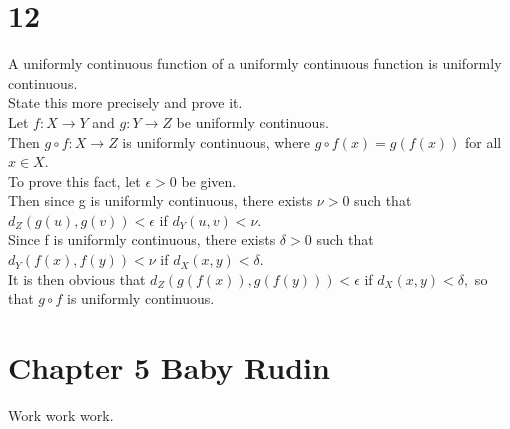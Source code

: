 \section*{12}
A uniformly continuous function of a uniformly continuous function is uniformly continuous. \\ 
State this more precisely and prove it. \\ 
Let $f: X \longrightarrow Y$ and $g: Y \longrightarrow Z$ be uniformly continuous. \\ 
Then $g \circ f : X \longrightarrow Z$ is uniformly continuous, where $g \circ f(x)=g(f(x))$ for all $x \in X.$ \\ 
To prove this fact, let $ \epsilon>0$ be given. \\ 
Then since g is uniformly continuous, there exists $ \nu >0$ such that $d_Z(g(u),g(v))< \epsilon$ if $d_Y(u,v)< \nu.$ \\ 
Since f is uniformly continuous, there exists $\delta >0$ such that $d_Y(f(x),f(y))< \nu$ if $d_X(x,y) < \delta.$ \\ 
It is then obvious that $d_Z(g(f(x)),g(f(y)))< \epsilon$ if $d_X(x,y)< \delta,$ so that $g \circ f$ is uniformly continuous. 



\section{Chapter 5 Baby Rudin}


Work work work.




\section{}